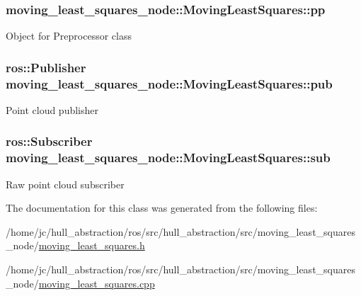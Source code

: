 \subsubsection[{\texorpdfstring{pp}{pp}}]{ moving\+\_\+least\+\_\+squares\+\_\+node\+::\+Moving\+Least\+Squares\+::pp\hspace{0.3cm}{\ttfamily [private]}}\hypertarget{classmoving__least__squares__node_1_1_moving_least_squares_a64551d7faad6e219620e142472edbada}{}\label{classmoving__least__squares__node_1_1_moving_least_squares_a64551d7faad6e219620e142472edbada}
Object for Preprocessor class 
\subsubsection[{\texorpdfstring{pub}{pub}}]{\setlength{\rightskip}{0pt plus 5cm}ros\+::\+Publisher moving\+\_\+least\+\_\+squares\+\_\+node\+::\+Moving\+Least\+Squares\+::pub\hspace{0.3cm}{\ttfamily [private]}}\hypertarget{classmoving__least__squares__node_1_1_moving_least_squares_a575c8db3fd78dc6e4bfd432d2d75916c}{}\label{classmoving__least__squares__node_1_1_moving_least_squares_a575c8db3fd78dc6e4bfd432d2d75916c}
Point cloud publisher 
\subsubsection[{\texorpdfstring{sub}{sub}}]{\setlength{\rightskip}{0pt plus 5cm}ros\+::\+Subscriber moving\+\_\+least\+\_\+squares\+\_\+node\+::\+Moving\+Least\+Squares\+::sub\hspace{0.3cm}{\ttfamily [private]}}\hypertarget{classmoving__least__squares__node_1_1_moving_least_squares_a3afb046b92a8d8df03d06542ba9fc9bd}{}\label{classmoving__least__squares__node_1_1_moving_least_squares_a3afb046b92a8d8df03d06542ba9fc9bd}
Raw point cloud subscriber 

The documentation for this class was generated from the following files\+:\begin{DoxyCompactItemize}
\item 
/home/jc/hull\+\_\+abstraction/ros/src/hull\+\_\+abstraction/src/moving\+\_\+least\+\_\+squares\+\_\+node/\hyperlink{moving__least__squares_8h}{moving\+\_\+least\+\_\+squares.\+h}\item 
/home/jc/hull\+\_\+abstraction/ros/src/hull\+\_\+abstraction/src/moving\+\_\+least\+\_\+squares\+\_\+node/\hyperlink{moving__least__squares_8cpp}{moving\+\_\+least\+\_\+squares.\+cpp}\end{DoxyCompactItemize}
